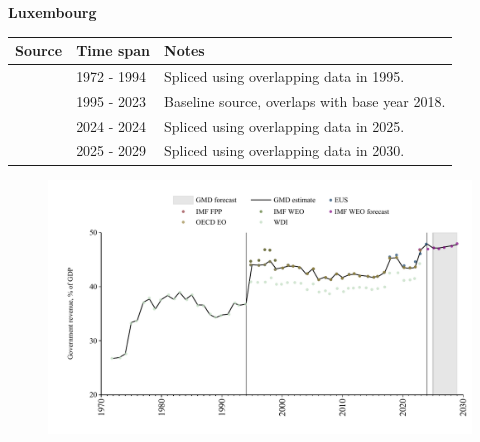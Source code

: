 \documentclass[12pt,a4paper,landscape]{article}
\begin{document}
\begin{adjustbox}{max totalsize={\paperwidth}{\paperheight},center}
\begin{minipage}[t][\textheight][t]{\textwidth}
\vspace*{0.5cm}
{}
\begin{center}
{\Large\bfseries Luxembourg}
\end{center}
\vspace{0.5cm}
\begin{table}[H]
\centering
\small
\begin{tabular}{|l|l|l|}
\hline
\textbf{Source} & \textbf{Time span} & \textbf{Notes} \\
\hline
\rowcolor{white}\cite{WDI}& 1972 - 1994 &Spliced using overlapping data in 1995.\\
\rowcolor{lightgray}\cite{OECD_EO}& 1995 - 2023 &Baseline source, overlaps with base year 2018.\\
\rowcolor{white}\cite{EUS}& 2024 - 2024 &Spliced using overlapping data in 2025.\\
\rowcolor{lightgray}\cite{IMF_WEO_forecast}& 2025 - 2029 &Spliced using overlapping data in 2030.\\
\hline
\end{tabular}
\end{table}
\begin{figure}[H]
\centering
\includegraphics[width=\textwidth,height=0.6\textheight,keepaspectratio]{graphs/LUX_govrev_GDP.pdf}
\end{figure}
\end{minipage}
\end{adjustbox}
\end{document}
